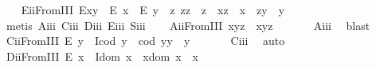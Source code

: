 \begin{isabellebody}
{\isafoldproof}%
%
\isadelimproof
\isanewline
%
\endisadelimproof
\ \ \isamarkupfalse%
\ E\isactrlsub i\isactrlsub iFromIII{\isacharcolon}\ {\isachardoublequoteopen}E{\isacharparenleft}x{\isasymcdot}y{\isacharparenright}\ \isactrlbold {\isasymleftarrow}\ {\isacharparenleft}E\ x\ \isactrlbold {\isasymand}\ E\ y\ \isactrlbold {\isasymand}\ {\isacharparenleft}\isactrlbold {\isasymexists}z{\isachardot}\ z{\isasymcdot}z\ {\isasymcong}\ z\ \isactrlbold {\isasymand}\ x{\isasymcdot}z\ {\isasymcong}\ x\ \isactrlbold {\isasymand}\ z{\isasymcdot}y\ {\isasymcong}\ y{\isacharparenright}{\isacharparenright}{\isachardoublequoteclose}\ \isanewline
%
\isadelimproof
\ \ \ \ %
\endisadelimproof
%
\isatagproof
{}\isamarkupfalse%
\ {\isacharparenleft}metis\ A\isactrlsub i\isactrlsub i\isactrlsub i\ C\isactrlsub i\isactrlsub i\isactrlsub i\ D\isactrlsub i\isactrlsub i\isactrlsub i\ E\isactrlsub i\isactrlsub i\isactrlsub i\ S\isactrlsub i\isactrlsub i\isactrlsub i{\isacharparenright}%
\endisatagproof
{\isafoldproof}%
%
\isadelimproof
\isanewline
%
\endisadelimproof
\ \ \isamarkupfalse%
\ A\isactrlsub i\isactrlsub iFromIII{\isacharcolon}\ {\isachardoublequoteopen}x{\isasymcdot}{\isacharparenleft}y{\isasymcdot}z{\isacharparenright}\ {\isasymcong}\ {\isacharparenleft}x{\isasymcdot}y{\isacharparenright}{\isasymcdot}z{\isachardoublequoteclose}\ \isanewline
%
\isadelimproof
\ \ \ \ %
\endisadelimproof
%
\isatagproof
{}\isamarkupfalse%
\ A\isactrlsub i\isactrlsub i\isactrlsub i\ \isamarkupfalse%
\ blast%
\endisatagproof
{\isafoldproof}%
%
\isadelimproof
\isanewline
%
\endisadelimproof
\ \ \isamarkupfalse%
\ C\isactrlsub i\isactrlsub iFromIII{\isacharcolon}\ {\isachardoublequoteopen}E\ y\ \isactrlbold {\isasymrightarrow}\ {\isacharparenleft}I{\isacharparenleft}cod\ y{\isacharparenright}\ \isactrlbold {\isasymand}\ {\isacharparenleft}cod\ y{\isacharparenright}{\isasymcdot}y\ {\isasymcong}\ y{\isacharparenright}{\isachardoublequoteclose}\ \isanewline
%
\isadelimproof
\ \ \ \ %
\endisadelimproof
%
\isatagproof
{}\isamarkupfalse%
\ C\isactrlsub i\isactrlsub i\isactrlsub i\ \isamarkupfalse%
\ auto%
\endisatagproof
{\isafoldproof}%
%
\isadelimproof
\isanewline
%
\endisadelimproof
\ \ \isamarkupfalse%
\ D\isactrlsub i\isactrlsub iFromIII{\isacharcolon}\ {\isachardoublequoteopen}E\ x\ \isactrlbold {\isasymrightarrow}\ {\isacharparenleft}I{\isacharparenleft}dom\ x{\isacharparenright}\ \isactrlbold {\isasymand}\ x{\isasymcdot}{\isacharparenleft}dom\ x{\isacharparenright}\ {\isasymcong}\ x{\isacharparenright}{\isachardoublequoteclose}\ \isanewline

\end{isabellebody}
